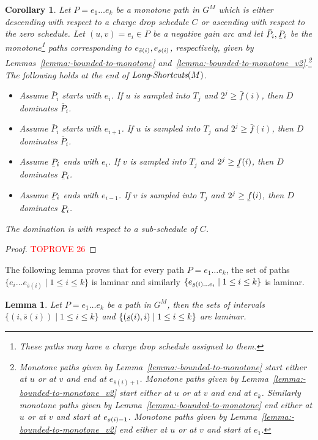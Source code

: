 \documentclass[11pt]{article}
\newtheorem{lemma}[theorem]{Lemma}
\newtheorem{corollary}[theorem]{Corollary}
\newcommand{\ubar}[1]{\underaccent{\bar}{{#1}}}
\newcommand{\LS}{\mbox{{\it Long}-{\it Shortcuts}}}
\begin{document}
\begin{corollary}\label{corollary:long-shortcuts}
    Let $P= e_1 \ldots e_k$ be a monotone path in $G^M$ which is either descending with respect to a charge drop schedule $C$ or ascending with respect to the zero schedule. Let $(u,v)=e_i\in P$ be a negative gain arc and let $\bar{P}_i,\ubar{P}_i$ be the monotone\footnote{These paths may have a charge drop schedule assigned to them.} paths corresponding to $e_{\bar{s}(i)},e_{\ubar{s}(i)}$, respectively, given by Lemmas~\ref{lemma:-bounded-to-monotone} and~\ref{lemma:-bounded-to-monotone_v2}.\footnote{Monotone paths given by Lemma~\ref{lemma:-bounded-to-monotone} start either at $u$ or at $v$ and end at $e_{\bar{s}(i)+1}$. Monotone paths given by Lemma~\ref{lemma:-bounded-to-monotone_v2} start either at $u$ or at $v$ and end at $e_k$. Similarly monotone paths given by Lemma~\ref{lemma:-bounded-to-monotone} end either at $u$ or at $v$ and start at $e_{\ubar{s}(i)-1}$. Monotone paths given by Lemma~\ref{lemma:-bounded-to-monotone_v2} end either at $u$ or at $v$ and start at $e_1$.} The following holds at the end of $\LS(M)$.
    \begin{itemize}
        \item Assume $\bar{P}_i$ starts with $e_i$. If $u$ is sampled into $T_j$ and $2^j\ge \bar{f}(i)$, then $D$ dominates $\bar{P}_i$.
        \item Assume $\bar{P}_i$ starts with $e_{i+1}$. If $u$ is sampled into $T_j$ and $2^j\ge \bar{f}(i)$, then $D$ dominates $\bar{P}_i$.
        \item Assume $\ubar{P}_i$ ends with $e_i$. If $v$ is sampled into $T_j$ and $2^j\ge \ubar{f}(i)$, then $D$ dominates $\ubar{P}_i$.
        \item Assume $\ubar{P}_i$ ends with $e_{i-1}$. If $v$ is sampled into $T_j$ and $2^j\ge \ubar{f}(i)$, then $D$ dominates $\ubar{P}_i$.
    \end{itemize}
    The domination is with respect to a sub-schedule of $C$.
\end{corollary}

\begin{proof}\textcolor{red}{TOPROVE 26}\end{proof}

The following lemma proves that for every path $P=e_1\ldots e_k$, the set of paths $\{e_i \ldots e_{\bar{s}(i)}\mid 1\le i \le k\}$ is laminar and similarly $\{  e_{\ubar{s}(i) \ldots e_i}\mid 1\le i \le k\}$ is laminar.

\begin{lemma}\label{lemma:laminar}
    Let $P=e_1 \ldots e_k$ be a path in $G^M$, then the sets of intervals $\{(i, \bar{s}(i)) \mid 1\le i \le k \}$ and $\{(\ubar{s}(i), i) \mid 1\le i \le k \}$ are laminar.
\end{lemma}
\end{document}
